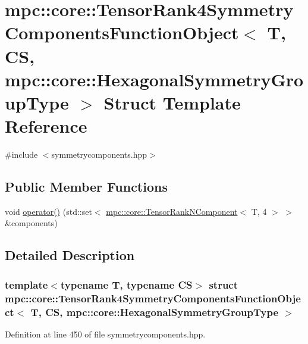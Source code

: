 \hypertarget{structmpc_1_1core_1_1_tensor_rank4_symmetry_components_function_object_3_01_t_00_01_c_s_00_01mpc53006a57374f233daf45c7959ab92c1e}{}\section{mpc\+:\+:core\+:\+:Tensor\+Rank4\+Symmetry\+Components\+Function\+Object$<$ T, CS, mpc\+:\+:core\+:\+:Hexagonal\+Symmetry\+Group\+Type $>$ Struct Template Reference}
\label{structmpc_1_1core_1_1_tensor_rank4_symmetry_components_function_object_3_01_t_00_01_c_s_00_01mpc53006a57374f233daf45c7959ab92c1e}


{\ttfamily \#include $<$symmetrycomponents.\+hpp$>$}

\subsection*{Public Member Functions}
\begin{DoxyCompactItemize}
\item 
void \mbox{\hyperlink{structmpc_1_1core_1_1_tensor_rank4_symmetry_components_function_object_3_01_t_00_01_c_s_00_01mpc53006a57374f233daf45c7959ab92c1e_a23417bd745bf260bd660d1d377050273}{operator()}} (std\+::set$<$ \mbox{\hyperlink{classmpc_1_1core_1_1_tensor_rank_n_component}{mpc\+::core\+::\+Tensor\+Rank\+N\+Component}}$<$ T, 4 $>$ $>$ \&components)
\end{DoxyCompactItemize}


\subsection{Detailed Description}
\subsubsection*{template$<$typename T, typename CS$>$\newline
struct mpc\+::core\+::\+Tensor\+Rank4\+Symmetry\+Components\+Function\+Object$<$ T, C\+S, mpc\+::core\+::\+Hexagonal\+Symmetry\+Group\+Type $>$}



Definition at line 450 of file symmetrycomponents.\+hpp.



